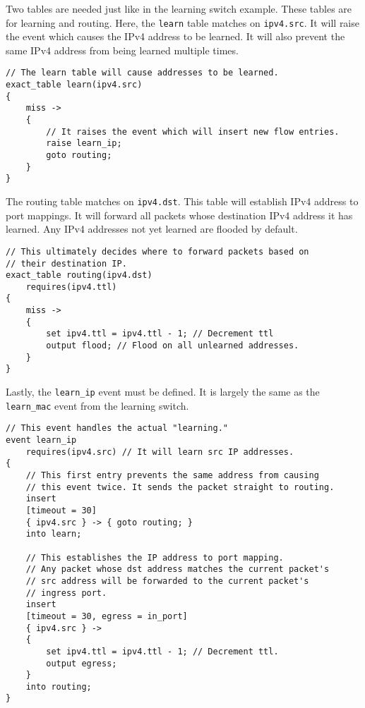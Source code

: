 Two tables are needed just like in the learning switch example. These tables are for learning and
routing. Here, the \texttt{learn} table matches on \texttt{ipv4.src}. It will raise the event which
causes the IPv4 address to be learned. It will also prevent the same IPv4 address
from being learned multiple times.

\begin{codepage}
\begin{lstlisting}
// The learn table will cause addresses to be learned.
exact_table learn(ipv4.src)
{
	miss ->
	{
		// It raises the event which will insert new flow entries.
		raise learn_ip;
		goto routing;
	}
}
\end{lstlisting}
\end{codepage}

The routing table matches on \texttt{ipv4.dst}. This table will establish IPv4
address to port mappings. It will forward all packets whose destination IPv4
address it has learned. Any IPv4 addresses not yet learned are flooded by
default.

\begin{codepage}
\begin{lstlisting}
// This ultimately decides where to forward packets based on
// their destination IP.
exact_table routing(ipv4.dst)
	requires(ipv4.ttl)
{
	miss ->
	{
		set ipv4.ttl = ipv4.ttl - 1; // Decrement ttl
		output flood; // Flood on all unlearned addresses.
	}
}
\end{lstlisting}
\end{codepage}

Lastly, the \texttt{learn\_ip} event must be defined. It is
largely the same as the \texttt{learn\_mac} event from the learning switch.

\begin{codepage}
\begin{lstlisting}
// This event handles the actual "learning."
event learn_ip
	requires(ipv4.src) // It will learn src IP addresses.
{
	// This first entry prevents the same address from causing
	// this event twice. It sends the packet straight to routing.
	insert
	[timeout = 30]
	{ ipv4.src } -> { goto routing; }
	into learn;

	// This establishes the IP address to port mapping.
	// Any packet whose dst address matches the current packet's
	// src address will be forwarded to the current packet's
	// ingress port.
	insert
	[timeout = 30, egress = in_port]
	{ ipv4.src } ->
	{
		set ipv4.ttl = ipv4.ttl - 1; // Decrement ttl.
		output egress;
	}
	into routing;
}
\end{lstlisting}
\end{codepage}

